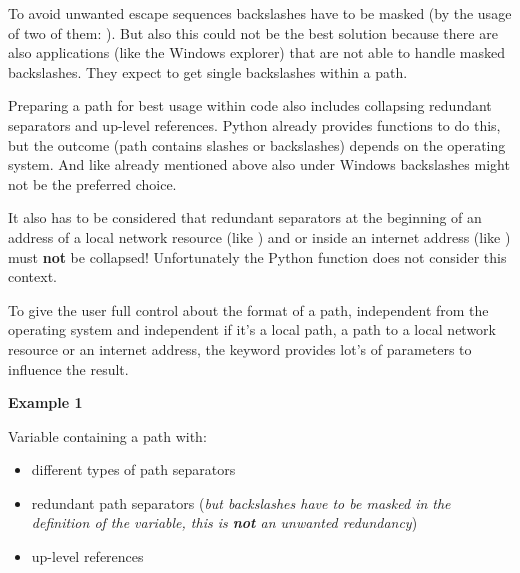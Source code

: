 To avoid unwanted escape sequences backslashes have to be masked (by the usage of two of them: ).
But also this could not be the best solution because there are also applications (like the Windows explorer) that are not able to handle
masked backslashes. They expect to get single backslashes within a path.

Preparing a path for best usage within code also includes collapsing redundant separators and up-level references.
Python already provides functions to do this, but the outcome (path contains slashes or backslashes) depends on the
operating system. And like already mentioned above also under Windows backslashes might not be the preferred choice.

It also has to be considered that redundant separators at the beginning of an address of a local network resource
(like ) and or inside an internet address (like ) must \textbf{not} be collapsed!
Unfortunately the Python function  does not consider this context.

To give the user full control about the format of a path, independent from the operating system and independent if it's
a local path, a path to a local network resource or an internet address, the keyword  provides
lot's of parameters to influence the result.

\vspace{1ex}

\textbf{Example 1}

\vspace{1ex}

Variable containing a path with:

\begin{itemize}
   \item different types of path separators
   \item redundant path separators (\textit{but backslashes have to be masked in the definition of the variable, this is \textbf{not} an unwanted redundancy})
   \item up-level references
\end{itemize}


